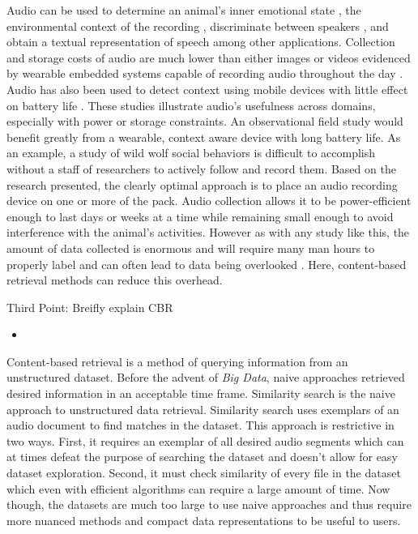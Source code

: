 Audio can be used to determine an animal's inner emotional state \cite{Farago2010}, the environmental context of the recording \cite{Eronen2006}, discriminate between speakers \cite{Campbell1997}, and obtain a textual representation of speech \cite{Rabiner1989} among other applications. Collection and storage costs of audio are much lower than either images or videos evidenced by wearable embedded systems capable of recording audio throughout the day \cite{Choudhury2008}. Audio has also been used to detect context using mobile devices with little effect on battery life \cite{Lane2015}. These studies illustrate audio's usefulness across domains, especially with power or storage constraints. An observational field study would benefit greatly from a wearable, context aware device with long battery life. As an example, a study of wild wolf social behaviors is difficult to accomplish without a staff of researchers to actively follow and record them. Based on the research presented, the clearly optimal approach is to place an audio recording device on one or more of the pack. Audio collection allows it to be power-efficient enough to last days or weeks at a time while remaining small enough to avoid interference with the animal's activities. However as with any study like this, the amount of data collected is enormous and will require many man hours to properly label and can often lead to data being overlooked \cite{Bardeli2009, Rong2018}. Here, content-based retrieval methods can reduce this overhead.

Third Point: Breifly explain CBR
\begin{itemize}
    \item 
\end{itemize}

Content-based retrieval is a method of querying information from an unstructured dataset. Before the advent of \textit{Big Data}, naive approaches retrieved desired information in an acceptable time frame. Similarity search is the naive approach to unstructured data retrieval. Similarity search uses exemplars of an audio document to find matches in the dataset. This approach is restrictive in two ways. First, it requires an exemplar of all desired audio segments which can at times defeat the purpose of searching the dataset and doesn't allow for easy dataset exploration. Second, it must check similarity of every file in the dataset which even with efficient algorithms can require a large amount of time. Now though, the datasets are much too large to use naive approaches and thus require more nuanced methods and compact data representations to be useful to users.

